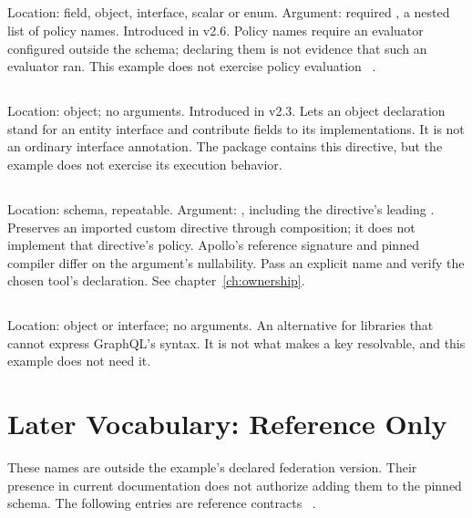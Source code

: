 \subsection*{}

Location: field, object, interface, scalar or enum. Argument: required
, a nested list of policy names.
Introduced in v2.6. Policy names require an evaluator configured outside the
schema; declaring them is not evidence that such an evaluator ran.
This example does not exercise policy evaluation
~\autocite{apollopolicy26repair}.

\subsection*{}

Location: object; no arguments. Introduced in v2.3.
Lets an object declaration stand for an entity interface and contribute
fields to its implementations. It is not an ordinary interface annotation.
The package contains this directive, but the example does not exercise its
execution behavior.

\subsection*{}

Location: schema, repeatable. Argument: , including the
directive's leading . Preserves an imported custom directive through
composition; it does not implement that directive's policy.
Apollo's reference signature and pinned compiler differ on the argument's
nullability. Pass an explicit name and verify the chosen tool's declaration.
See chapter~\ref{ch:ownership}.

\subsection*{}

Location: object or interface; no arguments. An alternative for libraries
that cannot express GraphQL's  syntax.
It is not what makes a key resolvable, and this example does not need it.

\section{Later Vocabulary: Reference Only}

These names are outside the example's declared federation version.
Their presence in current documentation does not authorize adding them to
the pinned schema. The following entries are reference contracts
~\autocite{apollodirectives,apollofederationversionsrepair}.

